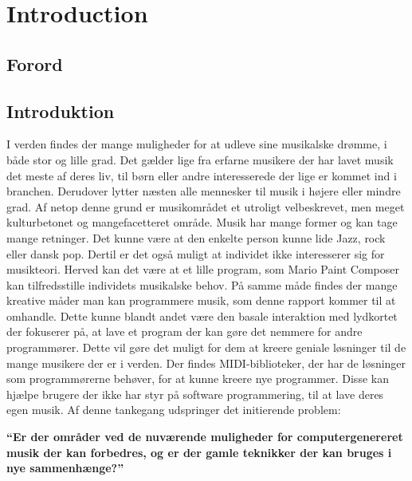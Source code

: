 \chapter{Introduction}

\section{Forord}

\section{Introduktion}
I verden findes der mange muligheder for at udleve sine musikalske drømme, i både stor og lille grad. Det gælder lige fra erfarne musikere der har lavet musik det meste af deres liv, til børn eller andre interesserede der lige er kommet ind i branchen. Derudover lytter næsten alle mennesker til musik i højere eller mindre grad. Af netop denne grund er musikområdet et utroligt velbeskrevet, men meget kulturbetonet og mangefacetteret område. 
Musik har mange former og kan tage mange retninger. Det kunne være at den enkelte person kunne lide Jazz, rock eller dansk pop. Dertil er det også muligt at individet ikke interesserer sig for musikteori. Herved kan det være at et lille program, som Mario Paint Composer kan tilfredsstille individets musikalske behov. På samme måde findes der mange kreative måder man kan programmere musik, som denne rapport kommer til at omhandle. Dette kunne blandt andet være den basale interaktion med lydkortet der fokuserer på, at lave et program der kan gøre det nemmere for andre programmører. Dette vil gøre det muligt for dem at kreere geniale løsninger til de mange musikere der er i verden. Der findes MIDI-biblioteker, der har de løsninger som programmørerne behøver, for at kunne kreere nye programmer. Disse kan hjælpe brugere der ikke har styr på software programmering, til at lave deres egen musik. Af denne tankegang udspringer det initierende problem:

\textbf{“Er der områder ved de nuværende muligheder for computergenereret musik der kan forbedres, og er der gamle teknikker der kan bruges i nye sammenhænge?”}


